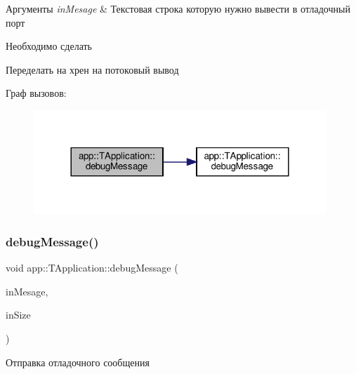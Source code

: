 \begin{DoxyParams}{Аргументы}
{\em in\+Mesage} & Текстовая строка которую нужно вывести в отладочный порт \\
\hline
\end{DoxyParams}
\begin{DoxyRefDesc}{Необходимо сделать}
\item[\hyperlink{todo__todo000001}{Необходимо сделать}]Переделать на хрен на потоковый вывод \end{DoxyRefDesc}
Граф вызовов\+:\nopagebreak
\begin{figure}[H]
\begin{center}
\leavevmode
\includegraphics[width=312pt]{classapp_1_1_t_application_abec229b87538c5db318ef57f25f6e84d_cgraph}
\end{center}
\end{figure}
\mbox{\label{classapp_1_1_t_application_ac0c8e394021c1d1ab4163bc8bd8f7b42}} 
\subsubsection{\texorpdfstring{debug\+Message()}{debugMessage()}\hspace{0.1cm}{\footnotesize\ttfamily [2/4]}}
{\footnotesize\ttfamily void app\+::\+T\+Application\+::debug\+Message (\begin{DoxyParamCaption}\item[{const char $\ast$}]{in\+Mesage,  }\item[{const std\+::size\+\_\+t}]{in\+Size }\end{DoxyParamCaption})}



Отправка отладочного сообщения 

